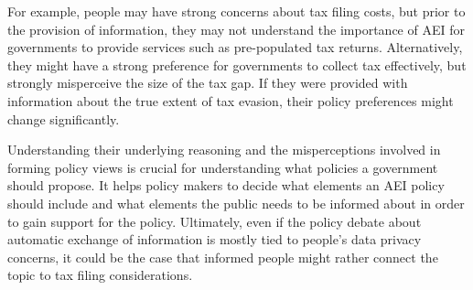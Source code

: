 \documentclass[11pt]{article}
\begin{document}
For example, people may have strong concerns about tax filing costs, but prior to the provision of information, they may not understand the importance of AEI for governments to provide services such as pre-populated tax returns. Alternatively, they might have a strong preference for governments to collect tax effectively, but strongly misperceive the size of the tax gap. If they were provided with information about the true extent of tax evasion, their policy preferences might change significantly. 

Understanding their underlying reasoning and the misperceptions involved in forming policy views is crucial for understanding what policies a government should propose. It helps policy makers to decide what elements an AEI policy should include and what elements the public needs to be informed about in order to gain support for the policy. Ultimately, even if the policy debate about automatic exchange of information is mostly tied to people's data privacy concerns, it could be the case that informed people might rather connect the topic to tax filing considerations.

\newpage
\printbibliography
\end{document}
